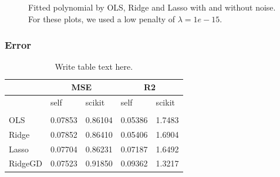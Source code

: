 \begin{figure} [H]
    \caption{Fitted polynomial by OLS, Ridge and Lasso with and without noise. For these plots, we used a low penalty of $\lambda=1e-15$.}%
    \label{fig:example}%
\end{figure}

\subsubsection{Error}

\begin{table} [H]
	\caption{Write table text here.  \vspace{2mm}}
	\begin{tabularx}{\textwidth}{l|XX|XX} \hline\hline
		\label{tab:franke_error}
		& \multicolumn{2}{c}{\textbf{MSE}}&\multicolumn{2}{c}{\textbf{R2}}\\ \hline
		&self&scikit&self&scikit\\ \hline \\
		OLS & 0.07853 & 0.86104 & 0.05386 & 1.7483\\
		Ridge & 0.07852 & 0.86410 & 0.05406 & 1.6904 \\
		Lasso & 0.07704 & 0.86231 & 0.07187 & 1.6492 \\
		RidgeGD & 0.07523 & 0.91850 & 0.09362 & 1.3217 \\ \hline
	\end{tabularx}
\end{table}